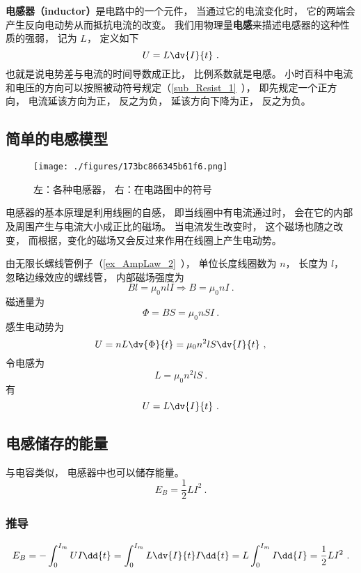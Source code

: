 
\begin{issues}
\issueAbstract
\end{issues}


\textbf{电感器（inductor）}是电路中的一个元件， 当通过它的电流变化时， 它的两端会产生反向电动势从而抵抗电流的改变。 我们用物理量\textbf{电感}来描述电感器的这种性质的强弱， 记为 $L$， 定义如下
\begin{equation}\label{eq_Induct_3}
U = L\dv{I}{t}~.
\end{equation}
也就是说电势差与电流的时间导数成正比， 比例系数就是电感。 小时百科中电流和电压的方向可以按照被动符号规定（\autoref{sub_Resist_1}~）， 即先规定一个正方向， 电流延该方向为正， 反之为负， 延该方向下降为正， 反之为负。

\subsection{简单的电感模型}

\begin{figure}[ht]
\centering
\texttt{[image: ./figures/173bc866345b61f6.png]}
\caption{左：各种电感器， 右：在电路图中的符号} \label{fig_Induct_1}
\end{figure}
电感器的基本原理是利用线圈的自感， 即当线圈中有电流通过时， 会在它的内部及周围产生与电流大小成正比的磁场。 当电流发生改变时， 这个磁场也随之改变， 而根据，变化的磁场又会反过来作用在线圈上产生电动势。

由无限长螺线管例子（\autoref{ex_AmpLaw_2}~）， 单位长度线圈数为 $n$， 长度为 $l$， 忽略边缘效应的螺线管， 内部磁场强度为
\begin{equation}
Bl = \mu_0nlI \Rightarrow B = \mu_0nI~.
\end{equation}
磁通量为
\begin{equation}
\Phi = BS = \mu_0nSI~.
\end{equation}
感生电动势为
\begin{equation}
U = nL\dv{\Phi}{t} = \mu_0n^2lS \dv{I}{t}~,
\end{equation}
令电感为
\begin{equation}\label{eq_Induct_1}
L = \mu_0n^2lS~.
\end{equation}
有
\begin{equation}\label{eq_Induct_2}
U = L\dv{I}{t}~.
\end{equation}

\subsection{电感储存的能量}
与电容类似， 电感器中也可以储存能量。
\begin{equation}
E_B = \frac{1}{2}L I^2~.
\end{equation}

\subsubsection{推导}
\begin{equation}
E_B = -\int_0^{I_m} U I \dd{t} = \int_0^{I_m} L \dv{I}{t} I \dd{t} = L\int_0^{I_m} I \dd{I} = \frac{1}{2} L I^2~.
\end{equation}
